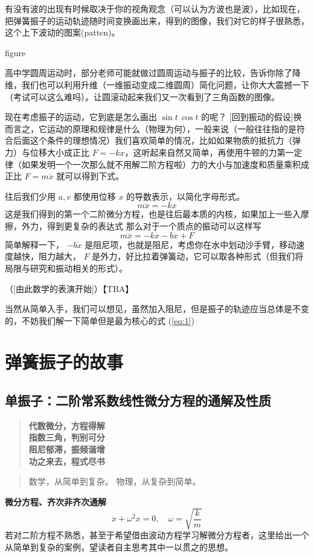 \documentclass[11pt]{book}
\begin{document}
有没有波的出现有时候取决于你的视角观念（可以认为方波也是波），比如现在，把弹簧振子的运动轨迹随时间变换画出来，得到的图像，我们对它的样子很熟悉，这个上下波动的图案(patten)。

figure

高中学圆周运动时，部分老师可能就做过圆周运动与振子的比较，告诉你除了降维，我们也可以利用升维（一维振动变成二维圆周）简化问题，让你大大震撼一下（考试可以这么难吗）。让圆滚动起来我们又一次看到了三角函数的图像。

现在考虑振子的运动，它到底是怎么画出 \(\sin t \,\cos t\) 的呢？
[回到振动的假设]换而言之，它运动的原理和规律是什么（物理为何），一般来说（一般往往指的是符合后面这个条件的理想情况）我们喜欢简单的情况，比如如果物质的抵抗力（弹力）与位移大小成正比 \(F=-kx\)，这听起来自然又简单，再使用牛顿的力第一定律（如果发明一个一次那么就不用解二阶方程啦）力的大小与加速度和质量乘积成正比 \(F=m\ddot{x}\)
就可以得到下式。

往后我们少用 \(a,v\) 都使用位移 \(x\) 的导数表示，以简化字母形式。
\begin{equation}
\label{eq:Hookma}
m\ddot{x}=-kx
\end{equation}
这是我们得到的第一个二阶微分方程，也是往后最本质的内核，如果加上一些入摩擦，外力，得到更复杂的表达式
那么对于一个质点的振动可以这样写
\begin{equation}
\label{eq:2}
m\ddot{x}=-kx-b\dot{x}+F
\end{equation}
简单解释一下， \(-b\dot{x}\) 是阻尼项，也就是阻尼，考虑你在水中划动沙手臂，移动速度越快，阻力越大， \(F\) 是外力，好比拉着弹簧动，它可以取各种形式（但我们将局限与研究和振动相关的形式）。


（[由此数学的表演开始]）【TBA】

当然从简单入手，我们可以想见，虽然加入阻尼，但是振子的轨迹应当总体是不变的，不妨我们解一下简单但是最为核心的式 (\ref{eq:1})

\part{弹簧振子的故事}
\label{sec:org8d761eb}
\chapter{单振子：二阶常系数线性微分方程的通解及性质}
\label{sec:org2936b48}
\begin{verse}
\textbf{代数微分，方程得解\\[0pt]
指数三角，判别可分}\\[0pt]
\textbf{阻尼郁滞，振频谐增\\[0pt]
功之来去，程式尽书}\\[0pt]
\end{verse}
\begin{quote}
数学，从简单到复杂。
物理，从复杂到简单。
\end{quote}
{\bf 微分方程、齐次非齐次通解}
$$\ddot{x}+\omega^{2}x=0,\quad\omega=\sqrt{\frac{k}{m}}$$
若对二阶方程不熟悉，甚至于希望借由波动方程学习解微分方程者，这里给出一个从简单到复杂的案例，望读者自主思考其中一以贯之的思想。
\end{document}
